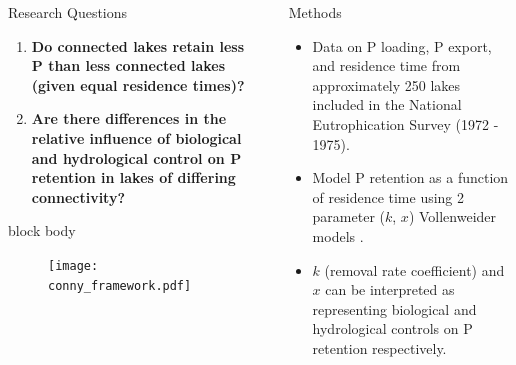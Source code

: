 \documentclass[final,hyperref={pdfpagelabels=false}]{beamer}
\begin{document}
\begin{frame}[t]
\begin{columns}[t]
\begin{column}{.465\textwidth}
\begin{block}{Research Questions}
\begin{enumerate} \large 
\item \textbf{Do connected lakes retain less P than less connected lakes (given equal residence times)?}
\vspace{1em}
\item \textbf{Are there differences in the relative influence of biological and hydrological control on P retention in lakes of differing connectivity?}
\end{enumerate}

\vspace{0.5em}
{
\begin{beamercolorbox}[wd=\textwidth,rounded=true]{block body}

\begin{figure}
  \texttt{[image: conny\_framework.pdf]}
\end{figure}

\end{beamercolorbox}
}
\vspace{0.5em}
\end{block}


\end{column} %

\begin{column}{.03\textwidth}\end{column} %
 
\begin{column}{.465\textwidth} %

\begin{block}{Methods}

\begin{itemize}
\item Data on P loading, P export, and residence time from approximately 250 lakes included in the National Eutrophication Survey (1972 - 1975)\cite{StachelekNationalEutrophicationSurvey2017}.
\vspace{1em}
\item Model P retention as a function of residence time using 2 parameter ($k$, $x$) Vollenweider models \cite{Brettreviewreassessmentlake2007}. 
\vspace{1em}
\item $k$ (removal rate coefficient) and $x$ can be interpreted as representing biological and hydrological controls on P retention respectively.


\end{itemize}
\end{block}
\end{column}
\end{columns}
\end{frame}
\end{document}
